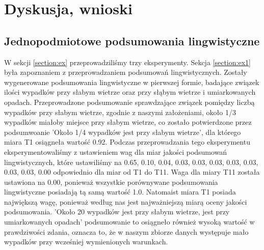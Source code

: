 \documentclass{classrep}
\begin{document}
\newpage


\section{Dyskusja, wnioski}
\subsection{Jednopodmiotowe podsumowania lingwistyczne}

W sekcji \ref{section:ex} przeprowadziliśmy trzy eksperymenty. Sekcja \ref{section:ex1} była zapoznaniem z przeprowadzaniem podsumowań lingwistycznych. Zostały wygenerowane podsumowania lingwistyczne w pierwszej formie, badające związek ilości wypadków przy słabym wietrze oraz przy słąbym wietrze i umiarkowanych opadach. Przeprowadzone podsumowanie sprawdzające związek pomiędzy liczbą wypadków przy słabym wietrze, zgodnie z naszymi założeniami, około 1/3 wypadków miałoby miejsce przy słabym wietrze, co zostało potwierdzone przez podsumwoanie 'Około 1/4 wypadków jest przy słabym wietrze', dla którego miara T1 osiągneła wartość 0.92. Podczas przeprowadzania tego eksperymentu eksperymentowaliśmy z ustawieniem wag dla miar jakości podsumowań lingwistycznych, które ustawiliśmy na 0.65, 0.10, 0.04, 0.03, 0.03, 0.03, 0.03, 0.03, 0.03, 0.03, 0.00 odpowiednio dla miar od T1 do T11. Waga dla miary T11 została ustawiona na 0.00, ponieważ wszystkie porównywane podsumowania lingwistyczne posiadają tą samą wartość 1.0. Natomaist miara T1 posiada największą wagę, ponieważ według nas jest najważniejszą miarą oceny jakości podsumowania. 'Około 20 wypadków jest przy słabym wietrze, jest przy umiarkowanych opadach' podsumowanie to osiągneło również wysoką wartość w prawdziwości zdania, oznacza to, że w naszym zbiorze danych występuje mało wypadków przy wcześniej wymienionych warunkach. \\
\end{document}
